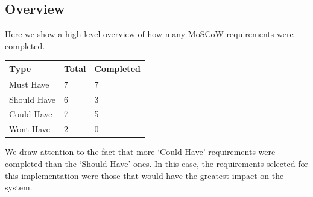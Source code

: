 \subsection{Overview}
Here we show a high-level overview of how many MoSCoW requirements were completed. 
\begin{table}[h]
\begin{tabular}{@{}lll@{}}
\toprule
\textbf{Type} & \textbf{Total} & \textbf{Completed} \\ \midrule
Must Have     & 7              & 7                  \\
Should Have   & 6              & 3                  \\
Could Have    & 7              & 5                  \\
Wont Have     & 2              & 0                   \\ \bottomrule
\end{tabular}
\end{table}

We draw attention to the fact that more `Could Have' requirements were completed than the `Should Have' ones. In this case, the requirements selected for this implementation were those that would have the greatest impact on the system.  

